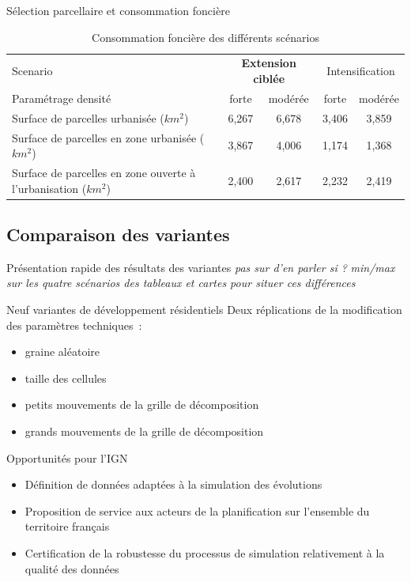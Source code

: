 \documentclass[xcolor=table]{beamer}
\newcommand\FontPetit{\fontsize{8}{6}\selectfont}
\begin{document}
\begin{frame}{Sélection parcellaire et consommation foncière}
\begin{table}
	\caption{Consommation foncière des différents scénarios}
	\scriptsize
	\begin{tabular}{|lcccc|}
		\hline 
		Scenario & \multicolumn{2}{c}{\textbf{Extension ciblée}}  & \multicolumn{2}{c}{Intensification} \\  
		Paramétrage densité & forte &modérée&  forte&modérée\\
		\hline 
		Surface de parcelles urbanisée ($km^{2}$)& 6,267 &6,678&3,406& 3,859 \\	
		\hline 
		Surface de parcelles en zone urbanisée ($km^{2}$)& 3,867 &4,006&1,174& 1,368\\	
		\hline 
		Surface de parcelles en zone ouverte à l'urbanisation ($km^{2}$)&2,400&2,617&2,232&2,419\\ 
		\hline 
	\end{tabular} 
\end{table}
\end{frame}

\subsection{Comparaison des variantes}

\begin{frame}{Présentation rapide des résultats des variantes}
\textit{pas sur d'en parler si ?}
\textit{min/max sur les quatre scénarios des tableaux et cartes pour situer ces différences}
\begin{block}{Neuf variantes de développement résidentiels}
	\vspace{0.1cm}
	Deux réplications de la modification des paramètres techniques~:
	\begin{itemize}
		\item graine aléatoire
		\item taille des cellules
		\item petits mouvements de la grille de décomposition
		\item grands mouvements de la grille de décomposition
	\end{itemize}
\end{block}
\end{frame}



\begin{frame}{Opportunités pour l'IGN}
\begin{itemize}
	\item Définition de données adaptées à la simulation des évolutions
	\item Proposition de service aux acteurs de la planification sur l'ensemble du territoire français
	\item Certification de la robustesse du processus de simulation relativement à la qualité des données
\end{itemize}
\end{frame}
\end{document}
